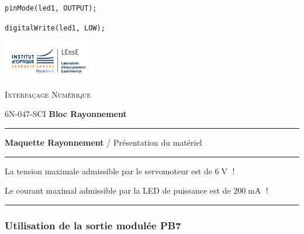 \documentclass[a4paper,11pt,titlepage]{article} %
\begin{document}
\begin{lstlisting}
pinMode(led1, OUTPUT);
\end{lstlisting}

\begin{lstlisting}
digitalWrite(led1, LOW);
\end{lstlisting}




\newpage
\begin{minipage}[c]{.25\linewidth}
	\includegraphics[width=4cm]{images/Logo-LEnsE.png}
\end{minipage} \hfill
\begin{minipage}[c]{.4\linewidth}

\begin{center}
\vspace{0.3cm}
{\Large \textsc{Interfaçage Numérique}}

\medskip

6N-047-SCI \qquad \textbf{\large Bloc Rayonnement}

\end{center}
\end{minipage}\hfill

\vspace{0.5cm}

\noindent \rule{\linewidth}{1pt}

{\noindent\Large \rule[-7pt]{0pt}{30pt} \textbf{Maquette Rayonnement} / Présentation du matériel}

\noindent \rule{\linewidth}{1pt}

\bigskip

{\LARGE La tension maximale admissible par le servomoteur est de $6\operatorname{V}$ !}

{\Large Le courant maximal admissible par la LED de puissance est de $200\operatorname{mA}$ !}

\bigskip

\noindent \rule{\linewidth}{1pt}






\subsubsection{Utilisation de la sortie modulée PB7}
	
\end{document}
